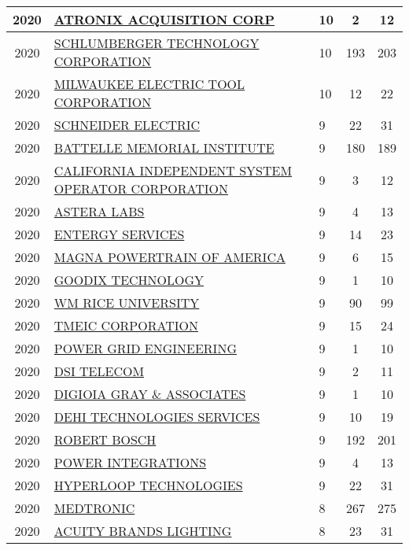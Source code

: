 \documentclass{article}%
\begin{document}
\begin{longtable}{c|p{20em}|p{5em}|c|c}
2020&\hyperref[subsec:ATRONIXACQUISITIONCORP]{ATRONIX ACQUISITION CORP}&10&2&12\\%
\hline%
2020&\hyperref[subsec:SCHLUMBERGERTECHNOLOGYCORPORATION]{SCHLUMBERGER TECHNOLOGY CORPORATION}&10&193&203\\%
\hline%
2020&\hyperref[subsec:MILWAUKEEELECTRICTOOLCORPORATION]{MILWAUKEE ELECTRIC TOOL CORPORATION}&10&12&22\\%
\hline%
2020&\hyperref[subsec:SCHNEIDERELECTRIC]{SCHNEIDER ELECTRIC}&9&22&31\\%
\hline%
2020&\hyperref[subsec:BATTELLEMEMORIALINSTITUTE]{BATTELLE MEMORIAL INSTITUTE}&9&180&189\\%
\hline%
2020&\hyperref[subsec:CALIFORNIAINDEPENDENTSYSTEMOPERATORCORPORATION]{CALIFORNIA INDEPENDENT SYSTEM OPERATOR CORPORATION}&9&3&12\\%
\hline%
2020&\hyperref[subsec:ASTERALABS]{ASTERA LABS}&9&4&13\\%
\hline%
2020&\hyperref[subsec:ENTERGYSERVICES]{ENTERGY SERVICES}&9&14&23\\%
\hline%
2020&\hyperref[subsec:MAGNAPOWERTRAINOFAMERICA]{MAGNA POWERTRAIN OF AMERICA}&9&6&15\\%
\hline%
2020&\hyperref[subsec:GOODIXTECHNOLOGY]{GOODIX TECHNOLOGY}&9&1&10\\%
\hline%
2020&\hyperref[subsec:WMRICEUNIVERSITY]{WM RICE UNIVERSITY}&9&90&99\\%
\hline%
2020&\hyperref[subsec:TMEICCORPORATION]{TMEIC CORPORATION}&9&15&24\\%
\hline%
2020&\hyperref[subsec:POWERGRIDENGINEERING]{POWER GRID ENGINEERING}&9&1&10\\%
\hline%
2020&\hyperref[subsec:DSITELECOM]{DSI TELECOM}&9&2&11\\%
\hline%
2020&\hyperref[subsec:DIGIOIAGRAYASSOCIATES]{DIGIOIA GRAY \& ASSOCIATES}&9&1&10\\%
\hline%
2020&\hyperref[subsec:DEHITECHNOLOGIESSERVICES]{DEHI TECHNOLOGIES SERVICES}&9&10&19\\%
\hline%
2020&\hyperref[subsec:ROBERTBOSCH]{ROBERT BOSCH}&9&192&201\\%
\hline%
2020&\hyperref[subsec:POWERINTEGRATIONS]{POWER INTEGRATIONS}&9&4&13\\%
\hline%
2020&\hyperref[subsec:HYPERLOOPTECHNOLOGIES]{HYPERLOOP TECHNOLOGIES}&9&22&31\\%
\hline%
2020&\hyperref[subsec:MEDTRONIC]{MEDTRONIC}&8&267&275\\%
\hline%
2020&\hyperref[subsec:ACUITYBRANDSLIGHTING]{ACUITY BRANDS LIGHTING}&8&23&31\\%

\end{longtable}
\end{document}
